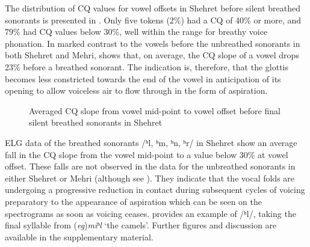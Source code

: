 \documentclass[output=paper]{langscibook}
\begin{document}
The distribution of CQ values for vowel offsets in Shehret before silent breathed sonorants is presented in . Only five tokens (2\%) had a CQ of 40\% or more, and 79\% had CQ values below 30\%, well within the range for breathy voice phonation. In marked contrast to the vowels before the unbreathed sonorants in both Shehret and Mehri,  shows that, on average, the CQ slope of a vowel drops 23\% before a breathed sonorant. The indication is, therefore, that the glottis becomes less constricted towards the end of the vowel in anticipation of its opening to allow voiceless air to flow through in the form of aspiration.


\begin{figure}
\caption{\label{fig:watson:23} Averaged CQ slope from vowel mid-point to vowel offset before final silent breathed sonorants in Shehret}
\end{figure}

ELG data of the breathed sonorants /ʰl, ʰm, ʰn, ʰr/ in Shehret show an average fall in the CQ slope from the vowel mid-point to a value below 30\% at vowel offset. These falls are not observed in the data for the unbreathed sonorants in either Shehret or Mehri (although see ). They indicate that the vocal folds are undergoing a progressive reduction in contact during subsequent cycles of voicing preparatory to the appearance of aspiration which can be seen on the spectrograms as soon as voicing ceases.  provides an example of \mbox{/ʰl/}, taking the final syllable from (\textit{eg})\textit{miʰl} ‘the camels’. Further figures and discussion are available in the supplementary material.
\end{document}
